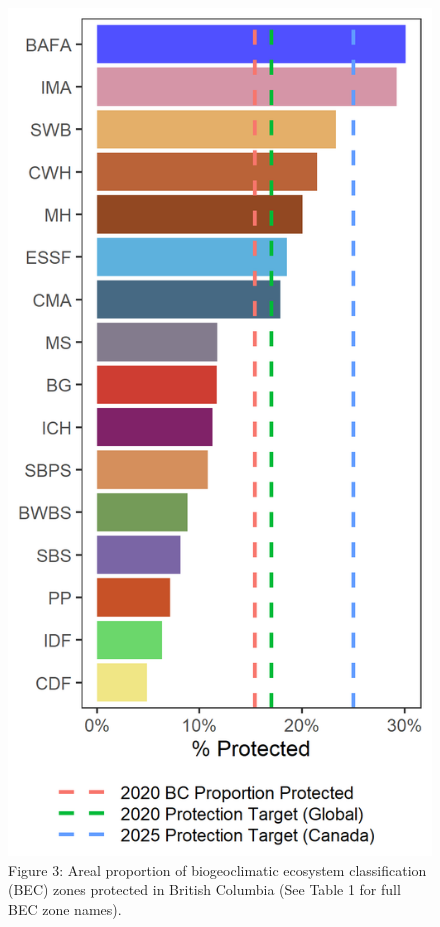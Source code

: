 \documentclass[10pt,oneside]{article}
\makeatletter
\def\maxwidth{\ifdim\Gin@nat@width>\linewidth\linewidth
\else\Gin@nat@width\fi}
\let\Oldincludegraphics\includegraphics
\renewcommand{\includegraphics}[1]{\Oldincludegraphics[width=\maxwidth]{#1}}
\makeatother
\begin{document}
\begin{figure}
\hypertarget{fig:bec-conch}{%
\centering
\includegraphics{figures/bec_bar.png}
\caption{Figure 3: Areal proportion of biogeoclimatic ecosystem
classification (BEC) zones protected in British Columbia (See Table 1
for full BEC zone names).}\label{fig:bec-conch}
}
\end{figure}
\end{document}
